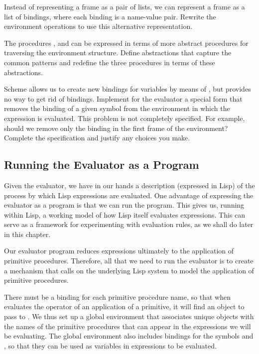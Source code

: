 \begin{exerciseGroup}
\label{Exercise 4.11}
 Instead of representing a frame
as a pair of lists, we can represent a frame as a list of bindings, where each
binding is a name-value pair.  Rewrite the environment operations to use this
alternative representation.

\label{Exercise 4.12}
 The procedures
,  and
 can be expressed in terms of more abstract
procedures for traversing the environment structure.  Define abstractions that
capture the common patterns and redefine the three procedures in terms of these
abstractions.

\label{Exercise 4.13}
 Scheme allows us to create new
bindings for variables by means of , but provides no way to get
rid of bindings.  Implement for the evaluator a special form
 that removes the binding of a given symbol from the
environment in which the  expression is evaluated.  This
problem is not completely specified.  For example, should we remove only the
binding in the first frame of the environment?  Complete the specification and
justify any choices you make.
\end{exerciseGroup}

\subsection{Running the Evaluator as a Program}
\label{Section 4.1.4}

Given the evaluator, we have in our hands a description (expressed in Lisp) of
the process by which Lisp expressions are evaluated.  One advantage of
expressing the evaluator as a program is that we can run the program.  This
gives us, running within Lisp, a working model of how Lisp itself evaluates
expressions.  This can serve as a framework for experimenting with evaluation
rules, as we shall do later in this chapter.

Our evaluator program reduces expressions ultimately to the application of
primitive procedures.  Therefore, all that we need to run the evaluator is to
create a mechanism that calls on the underlying Lisp system to model the
application of primitive procedures.

There must be a binding for each primitive procedure name, so that when
 evaluates the operator of an application of a primitive, it will
find an object to pass to .  We thus set up a global environment
that associates unique objects with the names of the primitive procedures that
can appear in the expressions we will be evaluating.  The global environment
also includes bindings for the symbols  and , so that
they can be used as variables in expressions to be evaluated.

